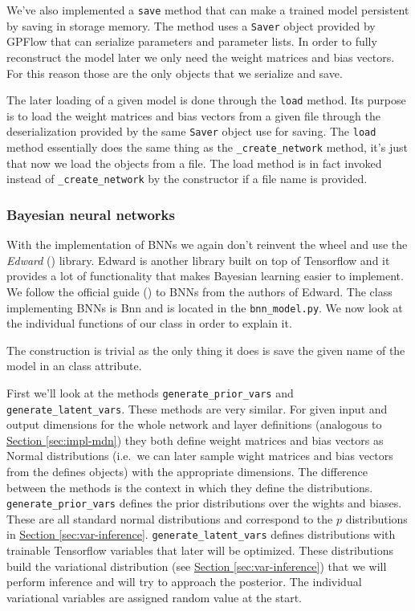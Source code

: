 \documentclass[12pt,a4paper,twoside]{scrartcl}
\numberwithin{equation}{section}
\newcommand{\refsec}[1]{\hyperref[#1]{Section \ref*{#1}}}
\begin{document}
We've also implemented a \texttt{save} method that can make a trained model persistent by saving in storage memory. The method uses a \texttt{Saver} object provided by GPFlow that can serialize parameters and parameter lists. In order to fully reconstruct the model later we only need the weight matrices and bias vectors. For this reason those are the only objects that we serialize and save.

The later loading of a given model is done through the \texttt{load} method. Its purpose is to load the weight matrices and bias vectors from a given file through the deserialization provided by the same \texttt{Saver} object use for saving. The \texttt{load} method essentially does the same thing as the \texttt{\_create\_network} method, it's just that now we load the objects from a file. The load method is in fact invoked instead of \texttt{\_create\_network} by the constructor if a file name is provided.
\subsubsection{Bayesian neural networks}\label{sec:impl-bnn}
With the implementation of BNNs we again don't reinvent the wheel and use the \emph{Edward} (\cite{edward}) library. Edward is another library built on top of Tensorflow and it provides a lot of functionality that makes Bayesian learning easier to implement. We follow the official guide (\cite{bnntut}) to BNNs from the authors of Edward. The class implementing BNNs is Bnn and is located in the \texttt{bnn\_model.py}. We now look at the individual functions of our class in order to explain it.

The construction is trivial as the only thing it does is save the given name of the model in an class attribute.

First we'll look at the methods \texttt{generate\_prior\_vars} and \texttt{generate\_latent\_vars}. These methods are very similar. For given input and output dimensions for the whole network and layer definitions (analogous to \refsec{sec:impl-mdn}) they both define weight matrices and bias vectors as Normal distributions (i.e.\ we can later sample wight matrices and bias vectors from the defines objects) with the appropriate dimensions. The difference between the methods is the context in which they define the distributions. \texttt{generate\_prior\_vars} defines the prior distributions over the wights and biases. These are all standard normal distributions and correspond to the \(p\) distributions in \refsec{sec:var-inference}. \texttt{generate\_latent\_vars} defines distributions with trainable Tensorflow variables that later will be optimized. These distributions build the variational distribution (see \refsec{sec:var-inference}) that we will perform inference and will try to approach the posterior. The individual variational variables are assigned random value at the start. 
\end{document}
